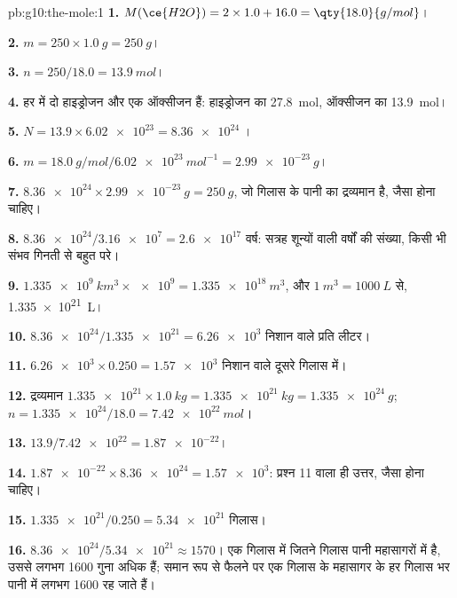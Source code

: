 \begin{solution}{pb:g10:the-mole:1}
\textbf{1.} $M(\ce{H2O}) = 2 \times 1.0 + 16.0 = \qty{18.0}{g/mol}$।

\textbf{2.} $m = 250 \times \qty{1.0}{g} = \qty{250}{g}$।

\textbf{3.} $n = 250 / 18.0 = \qty{13.9}{mol}$।

\textbf{4.} हर  में दो हाइड्रोजन  और एक ऑक्सीजन  हैं:
हाइड्रोजन  का \qty{27.8}{mol}, ऑक्सीजन  का \qty{13.9}{mol}।

\textbf{5.} $N = 13.9 \times \num{6.02e23} = \num{8.36e24}$ ।

\textbf{6.} $m = \qty{18.0}{g/mol} / \qty{6.02e23}{mol^{-1}} =
\qty{2.99e-23}{g}$।

\textbf{7.} $\num{8.36e24} \times \qty{2.99e-23}{g} = \qty{250}{g}$, जो
गिलास के पानी का द्रव्यमान है, जैसा होना चाहिए।

\textbf{8.} $\num{8.36e24} / \num{3.16e7} = \num{2.6e17}$ वर्ष: सत्रह शून्यों
वाली वर्षों की संख्या, किसी भी संभव गिनती से बहुत परे।

\textbf{9.} $\qty{1.335e9}{km^3} \times \num{e9} = \qty{1.335e18}{m^3}$,
और $\qty{1}{m^3} = \qty{1000}{L}$ से, \qty{1.335e21}{L}।

\textbf{10.} $\num{8.36e24} / \num{1.335e21} = \num{6.26e3}$ निशान वाले
 प्रति लीटर।

\textbf{11.} $\num{6.26e3} \times 0.250 = \num{1.57e3}$ निशान वाले 
दूसरे गिलास में।

\textbf{12.} द्रव्यमान $\num{1.335e21} \times \qty{1.0}{kg} =
\qty{1.335e21}{kg} = \qty{1.335e24}{g}$; $n = \num{1.335e24} / 18.0 =
\qty{7.42e22}{mol}$।

\textbf{13.} $13.9 / \num{7.42e22} = \num{1.87e-22}$।

\textbf{14.} $\num{1.87e-22} \times \num{8.36e24} = \num{1.57e3}$: प्रश्न 11
वाला ही उत्तर, जैसा होना चाहिए।

\textbf{15.} $\num{1.335e21} / 0.250 = \num{5.34e21}$ गिलास।

\textbf{16.} $\num{8.36e24} / \num{5.34e21} \approx 1570$। एक गिलास में
जितने गिलास पानी महासागरों में है, उससे लगभग 1600 गुना अधिक  हैं;
समान रूप से फैलने पर एक गिलास के  महासागर के हर गिलास भर पानी में
लगभग 1600 रह जाते हैं।


\end{solution}
